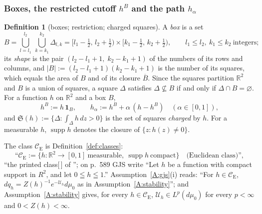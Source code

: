 \documentclass[11pt,a4paper]{article}
\theoremstyle{plain}
\theoremstyle{definition}
\theoremstyle{plain}
\theoremstyle{definition}
\newtheorem{auxdef}[auxlemma]{Definition}
\newcommand{\R}{\mathbb{R}}
\newcommand{\CE}{\mathcal{C}_{\mathrm E}}
\DeclareMathOperator{\supp}{supp}
\newcommand{\Uc}{\mathcal U}
\newcommand{\dmu}{d\mu_0}
\begin{document}
\subsubsection{Boxes, the restricted cutoff $h^B$ and the path $h_\alpha$}\label{sec:notation-boxes}

\begin{auxdef}[boxes; restriction; charged squares]\label{aux:notation-box}
A \emph{box} is a set
\[
 B=\bigcup_{l=l_1}^{l_2}\ \bigcup_{k=k_1}^{k_2}\Delta_{l,k}
 =[l_1-\tfrac12,\,l_2+\tfrac12)\times[k_1-\tfrac12,\,k_2+\tfrac12),
 \qquad l_1\le l_2,\ k_1\le k_2\ \text{integers};
\]
its \emph{shape} is the pair $(l_2-l_1+1,\;k_2-k_1+1)$ of the numbers of its rows and
columns, and $|B|:=(l_2-l_1+1)(k_2-k_1+1)$ is the number of its squares, which equals the
area of $B$ and of its closure $\overline B$.  Since the squares partition $\R^2$ and $B$ is
a union of squares, a square $\Delta$ satisfies $\Delta\not\subseteq B$ if and only if
$\Delta\cap B=\varnothing$.  For a function $h$ on $\R^2$ and a box $B$,
\[
 h^B:=h\,\mathbf 1_B,\qquad h_\alpha:=h^B+\alpha\,(h-h^B)\quad(\alpha\in[0,1]),
\]
and $\mathfrak S(h):=\{\Delta:\int_\Delta h\,dz>0\}$ is the set of squares \emph{charged}
by $h$.  For a measurable $h$, $\supp h$ denotes the closure of $\{z:h(z)\ne0\}$.
\end{auxdef}

The class $\CE$ is Definition~\ref{def:classes}:
\[
 \text{``}\CE:=\{h:\R^2\to[0,1]\ \text{measurable},\ \supp h\ \text{compact}\}
 \quad\text{(Euclidean class)''},
\]
``the printed class[\,] of \cite[p.~589]{GJS}''; on p.~589 GJS write ``Let $h$ be
a function with compact support in $R^2$, and let $0\leqq h\leqq1$.''  Assumption~\ref{A:gjs}(i) reads: ``For $h\in\CE$, $dq_h=Z(h)^{-1}e^{-\mathcal U_h}d\mu_0$ as in
Assumption~\ref{A:stability}''; and Assumption~\ref{A:stability} gives, for every $h\in\CE$,
$\Uc_h\in L^p(\dmu)$ for every $p<\infty$ and $0<Z(h)<\infty$.
\end{document}
